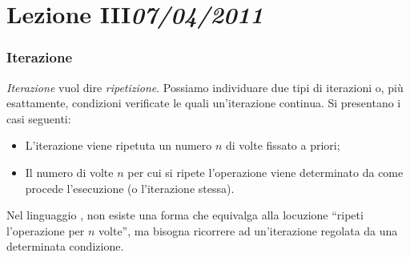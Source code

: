 \chapter[Lezione III]{Lezione III\newline\small{\emph{07/04/2011}}}
	\subsection{Iterazione}
	\label{sec:it}

\emph{Iterazione} vuol dire \emph{ripetizione}. Possiamo individuare due tipi di iterazioni o, più esattamente, condizioni verificate le quali un'iterazione continua.
Si presentano i casi seguenti:
\begin{itemize}
	\item
L'iterazione viene ripetuta un numero $n$ di volte fissato a priori;
	\item
Il numero di volte $n$ per cui si ripete l'operazione viene determinato da come procede l'esecuzione (o l'iterazione stessa).
\end{itemize}	
Nel linguaggio , non esiste una forma che equivalga alla locuzione ``ripeti l'operazione per $n$ volte'', ma bisogna ricorrere ad un'iterazione regolata da una determinata condizione.


